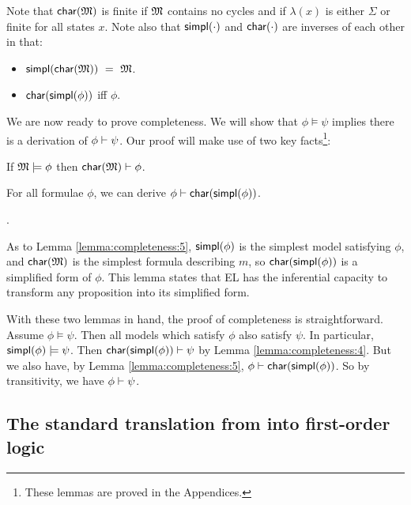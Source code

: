 \NI Note that $\mathsf{char}(\frak{M})$ is finite if $\frak{M}$ contains no cycles and if
$\lambda(x)$ is either $\Sigma$ or finite for all states $x$.
Note also that $\mathsf{simpl}(\cdot)$ and $\mathsf{char}(\cdot)$ are inverses of each other in that:

\begin{itemize}

\item $\mathsf{simpl}(\mathsf{char}(\frak{M})) \ = \  \frak{M}$. 

\item $\mathsf{char}(\mathsf{simpl}(\phi))$ iff $\phi$.

\end{itemize}

\NI We are now ready to prove completeness.  We will show that $\phi
\models \psi$ implies there is a derivation of $\phi \vdash \psi$.  Our proof
will make use of two key facts\footnote{These lemmas are proved in the Appendices.}:

\begin{lemma}\label{lemma:completeness:4}
If $\frak{M} \models \phi$ then $\mathsf{char}(\frak{M}) \vdash \phi$.
\end{lemma}

\begin{lemma}\label{lemma:completeness:5}
For all formulae $\phi$, we can derive $\phi \vdash \mathsf{char}(\mathsf{simpl}(\phi))$.
\end{lemma}

.

As to Lemma \ref{lemma:completeness:5}, $\mathsf{simpl}(\phi)$ is the simplest model
satisfying $\phi$, and $\mathsf{char}(\frak{M})$ is the simplest formula describing
$m$, so $\mathsf{char}(\mathsf{simpl}(\phi))$ is a simplified form of $\phi$. This lemma
states that EL has the inferential capacity to transform any
proposition into its simplified form.

With these two lemmas in hand, the proof of completeness is
straightforward.  Assume $\phi \models \psi$.  Then all models which satisfy
$\phi$ also satisfy $\psi$.  In particular, $\mathsf{simpl}(\phi) \models \psi$.  Then
$\mathsf{char}(\mathsf{simpl}(\phi)) \vdash \psi$ by Lemma \ref{lemma:completeness:4}.  But we
also have, by Lemma \ref{lemma:completeness:5}, $\phi \vdash
\mathsf{char}(\mathsf{simpl}(\phi)) $.  So by transitivity, we have $\phi \vdash \psi$.  


\subsection{The standard translation from  \ELABR{} into 
            first-order logic}\label{standardTranslation}


